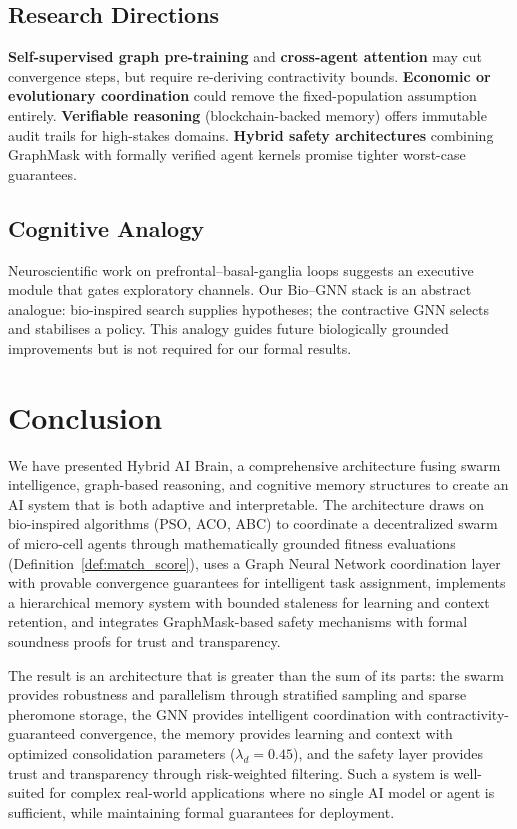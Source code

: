 \documentclass{article}
\begin{document}
\subsection{Research Directions}
\textbf{Self-supervised graph pre-training} and \textbf{cross-agent attention} may cut convergence steps, but require re-deriving contractivity bounds. \textbf{Economic or evolutionary coordination} could remove the fixed-population assumption entirely. \textbf{Verifiable reasoning} (blockchain-backed memory) offers immutable audit trails for high-stakes domains. \textbf{Hybrid safety architectures} combining GraphMask with formally verified agent kernels promise tighter worst-case guarantees.

\subsection{Cognitive Analogy}
Neuroscientific work on prefrontal–basal-ganglia loops suggests an executive module that gates exploratory channels. Our Bio–GNN stack is an abstract analogue: bio-inspired search supplies hypotheses; the contractive GNN selects and stabilises a policy. This analogy guides future biologically grounded improvements but is not required for our formal results.

\section{Conclusion}

We have presented Hybrid AI Brain, a comprehensive architecture fusing swarm intelligence, graph-based reasoning, and cognitive memory structures to create an AI system that is both adaptive and interpretable. The architecture draws on bio-inspired algorithms (PSO, ACO, ABC) to coordinate a decentralized swarm of micro-cell agents through mathematically grounded fitness evaluations (Definition~\ref{def:match_score}), uses a Graph Neural Network coordination layer with provable convergence guarantees for intelligent task assignment, implements a hierarchical memory system with bounded staleness for learning and context retention, and integrates GraphMask-based safety mechanisms with formal soundness proofs for trust and transparency.

The result is an architecture that is greater than the sum of its parts: the swarm provides robustness and parallelism through stratified sampling and sparse pheromone storage, the GNN provides intelligent coordination with contractivity-guaranteed convergence, the memory provides learning and context with optimized consolidation parameters ($\lambda_d = 0.45$), and the safety layer provides trust and transparency through risk-weighted filtering. Such a system is well-suited for complex real-world applications where no single AI model or agent is sufficient, while maintaining formal guarantees for deployment.
\end{document}
